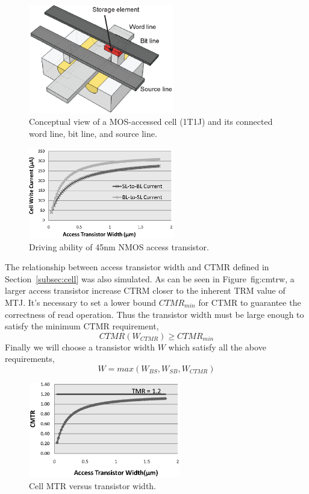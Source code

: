 \begin{figure}[t]
  \centering
  \includegraphics[width=2.5in]{fig/1t1r.eps}
  \caption{Conceptual view of a MOS-accessed cell (1T1J) and its connected word line, bit line, and source line.}
  \label{fig:1t1r}
\end{figure}
\begin{figure}[t]
  \centering
  \includegraphics[width=2.5in]{fig/IC_W.eps}
  \caption{Driving ability of 45nm NMOS access transistor.}
  \label{fig:icw}
\end{figure}

The relationship between access transistor width and CTMR defined in Section~\ref{subsec:cell} was also simulated. As can be seen in Figure~{fig:cmtrw}, a larger access transistor increase CTRM closer to the inherent TRM value of MTJ. It's necessary to set a lower bound $CTMR_{min}$ for CTMR to guarantee the correctness of read operation. Thus the transistor width must be large enough to satisfy the minimum CTMR requirement,
\begin{equation}
CTMR(W_{CTMR}) \geq CTMR_{min}
\end{equation}
Finally we will choose a transistor width $W$ which satisfy all the above requirements, 
\begin{equation}
W = max(W_{BS}, W_{SB}, W_{CTMR}) \label{equ:width}
\end{equation}

\begin{figure}[t]
  \centering
  \includegraphics[width=2.6in]{fig/CMTR_W.eps}
  \caption{Cell MTR versus transistor width.}
  \label{fig:cmtrw}
\end{figure}

